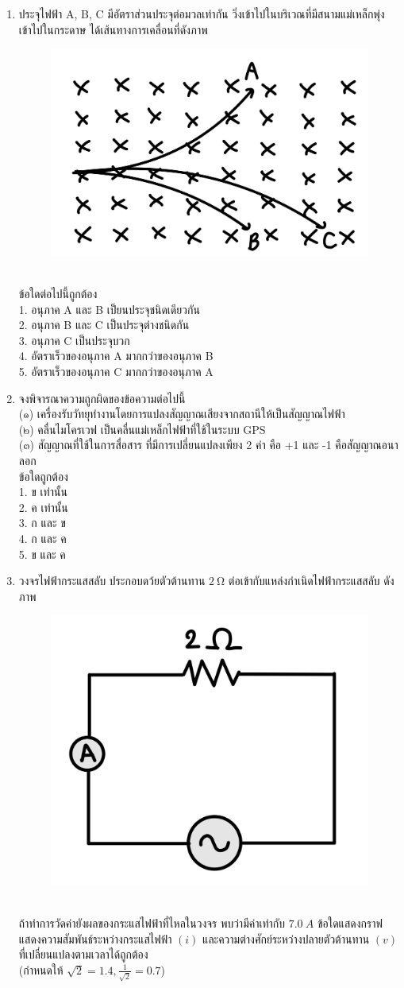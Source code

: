 \documentclass[a4paper,12pt]{article}
\begin{document}
\begin{enumerate}
		\item ประจุไฟฟ้า A, B, C มีอัตราส่วนประจุต่อมวลเท่ากัน วิ่งเข้าไปในบริเวณที่มีสนามแม่เหล็กพุ่งเข้าไปในกระดาษ ได้เส้นทางการเคลื่อนที่ดังภาพ
		\begin{figure}[h]
			\centering
			\includegraphics[width=0.3\linewidth]{16}
		\end{figure}\\
		ข้อใดต่อไปนี้ถูกต้อง\\
		1. อนุภาค A และ B เป็ยนประจุชนิดเดียวกัน\\
		2. อนุภาค B และ C เป็นประจุต่างชนิดกัน\\
		3. อนุภาค C เป็นประจุบวก\\
		4. อัตราเร็วของอนุภาค A มากกว่าของอนุภาค B\\
		5. อัตราเร็วของอนุภาค C มากกว่าของอนุภาค A\\
		
		\item จงพิจารณาความถูกผิดของข้อความต่อไปนี้\\
		(๑\textenglish{)} เครื่องรับวัทยุทำงานโดยการแปลงสัญญาณเสียงจากสถานีให้เป็นสัญญาณไฟฟ้า\\
		(๒\textenglish{)} คลื่นไมโครเวฟ เป็นคลื่นแม่เหล็กไฟฟ้าที่ใช้ในระบบ GPS\\
		(๓\textenglish{)} สัญญาณที่ใช้ในการสื่อสาร ที่มีการเปลี่ยนแปลงเพียง 2 ค่า คือ +1 และ -1 คือสัญญาณอนาลอก\\
		ข้อใดถูกต้อง\\
		1. ข เท่านั้น\\
		2. ค เท่านั้น\\
		3. ก และ ข\\
		4. ก และ ค\\
		5. ข และ ค
		\item วงจรไฟฟ้ากระแสสลับ ประกอบดว้ยตัวต้านทาน \(\SI{2}{\ohm}\) ต่อเข้ากับแหล่งกำเนิดไฟฟ้ากระแสสลับ ดังภาพ
		\begin{figure}[h]
			\centering
			\includegraphics[width=0.3\linewidth]{18}
		\end{figure}\\
		ถ้าทำการวัดค่ายังผลของกระแสไฟฟ้าที่ไหลในวงจร พบว่ามีค่าเท่ากับ \(\SI{7.0}{A}\) ข้อใดแสดงกราฟแสดงความสัมพันธ์ระหว่างกระแสไฟฟ้า \((i)\) และความต่างศักย์ระหว่างปลายตัวต้านทาน \((v)\) ที่เปลี่ยนแปลงตามเวลาได้ถูกต้อง\\
		(กำหนดให้ \(\sqrt{2}=1.4,\frac{1}{\sqrt{2}}=0.7\))
			\vspace{4cm}	
			

\end{enumerate}
\end{document}
